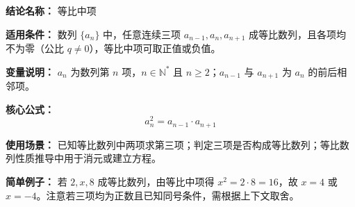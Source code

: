 \textbf{结论名称：} 等比中项

\textbf{适用条件：} 数列 \(\{a_n\}\) 中，任意连续三项 \(a_{n-1}, a_n, a_{n+1}\) 成等比数列，且各项均不为零（公比 \(q \neq 0\)），等比中项可取正值或负值。

\textbf{变量说明：} \(a_n\) 为数列第 \(n\) 项，\(n \in \mathbb{N}^*\) 且 \(n \ge 2\)；\(a_{n-1}\) 与 \(a_{n+1}\) 为 \(a_n\) 的前后相邻项。

\textbf{核心公式：} 
\[
\boxed{a_n^2 = a_{n-1} \cdot a_{n+1}}
\]

\textbf{使用场景：} 已知等比数列中两项求第三项；判定三项是否构成等比数列；等比数列性质推导中用于消元或建立方程。

\textbf{简单例子：} 若 \(2, x, 8\) 成等比数列，由等比中项得 \(x^2 = 2 \cdot 8 = 16\)，故 \(x = 4\) 或 \(x = -4\)。注意若三项均为正数且已知同号条件，需根据上下文取舍。